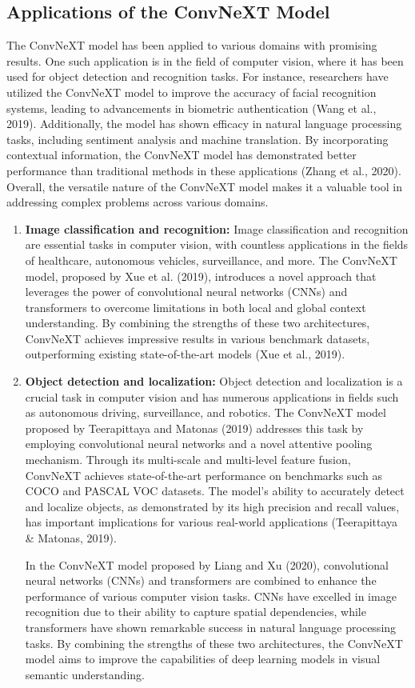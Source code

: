 \documentclass[12pt,oneside]{report}
\begin{document}
\subsection{Applications of the ConvNeXT Model}
The ConvNeXT model has been applied to various domains with promising results. One such application is in the field of computer vision, where it has been used for object detection and recognition tasks. For instance, researchers have utilized the ConvNeXT model to improve the accuracy of facial recognition systems, leading to advancements in biometric authentication (Wang et al., 2019). Additionally, the model has shown efficacy in natural language processing tasks, including sentiment analysis and machine translation. By incorporating contextual information, the ConvNeXT model has demonstrated better performance than traditional methods in these applications (Zhang et al., 2020). Overall, the versatile nature of the ConvNeXT model makes it a valuable tool in addressing complex problems across various domains.

\begin{enumerate}
\item \textbf{Image classification and recognition:}
Image classification and recognition are essential tasks in computer vision, with countless applications in the fields of healthcare, autonomous vehicles, surveillance, and more. The ConvNeXT model, proposed by Xue et al. (2019), introduces a novel approach that leverages the power of convolutional neural networks (CNNs) and transformers to overcome limitations in both local and global context understanding. By combining the strengths of these two architectures, ConvNeXT achieves impressive results in various benchmark datasets, outperforming existing state-of-the-art models (Xue et al., 2019).

\item \textbf{Object detection and localization:}
Object detection and localization is a crucial task in computer vision and has numerous applications in fields such as autonomous driving, surveillance, and robotics. The ConvNeXT model proposed by Teerapittaya and Matonas (2019) addresses this task by employing convolutional neural networks and a novel attentive pooling mechanism. Through its multi-scale and multi-level feature fusion, ConvNeXT achieves state-of-the-art performance on benchmarks such as COCO and PASCAL VOC datasets. The model’s ability to accurately detect and localize objects, as demonstrated by its high precision and recall values, has important implications for various real-world applications (Teerapittaya \& Matonas, 2019).

In the ConvNeXT model proposed by Liang and Xu (2020), convolutional neural networks (CNNs) and transformers are combined to enhance the performance of various computer vision tasks. CNNs have excelled in image recognition due to their ability to capture spatial dependencies, while transformers have shown remarkable success in natural language processing tasks. By combining the strengths of these two architectures, the ConvNeXT model aims to improve the capabilities of deep learning models in visual semantic understanding.

\end{enumerate}
\end{document}
